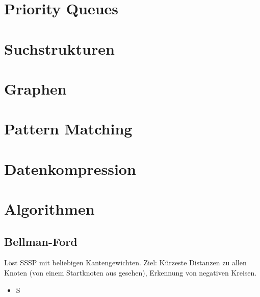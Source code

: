 \documentclass[12pt,a4paper]{article}
\begin{document}
\section{Priority Queues}
\section{Suchstrukturen}
\section{Graphen}
\section{Pattern Matching}
\section{Datenkompression}
\section{Algorithmen}
\subsection{Bellman-Ford}
Löst SSSP mit beliebigen Kantengewichten. Ziel: Kürzeste Distanzen zu allen Knoten (von einem Startknoten aus gesehen), Erkennung von negativen Kreisen.
\begin{itemize}
\item S
\end{itemize}
\end{document}
